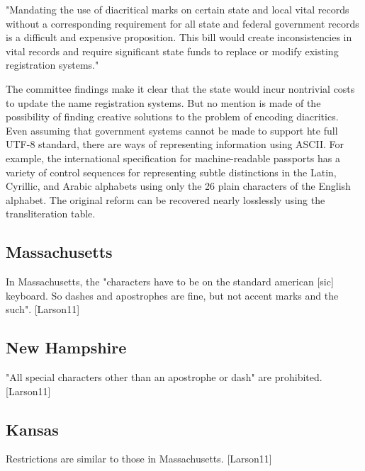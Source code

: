 "Mandating the use of diacritical marks on certain state and local vital records
without a corresponding requirement for all state and federal government records
is a difficult and expensive proposition.  This bill would create
inconsistencies in vital records and require significant state funds to replace
or modify existing registration systems."

The committee findings make it clear that the state would incur nontrivial costs
to update the name registration systems. But no mention is made of the
possibility of finding creative solutions to the problem of encoding diacritics.
Even assuming that government systems cannot be made to support hte full UTF-8
standard, there are ways of representing information using ASCII. For example,
the international specification for machine-readable passports has a variety of
control sequences for representing subtle distinctions in the Latin, Cyrillic,
and Arabic alphabets using only the 26 plain characters of the English alphabet.
The original reform can be recovered nearly losslessly using the transliteration
table.

\subsection{Massachusetts}

In Massachusetts, the "characters have to be on the standard american
{[}sic{]} keyboard. So dashes and apostrophes are fine, but not accent
marks and the such". {[}Larson11{]}

\subsection{New Hampshire}

"All special characters other than an apostrophe or dash" are
prohibited. {[}Larson11{]}

\subsection{Kansas}

Restrictions are similar to those in Massachusetts. {[}Larson11{]}
